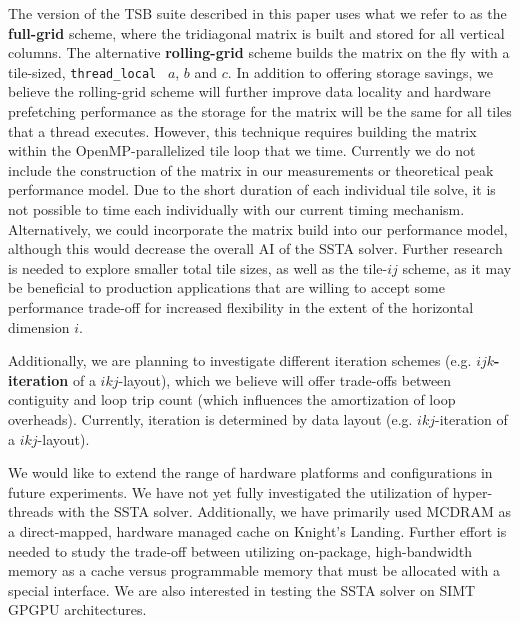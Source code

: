 \documentclass{sig-alternate-05-2015}
\begin{document}
The version of the TSB suite described in this paper uses what we refer to as
  the \textbf{full-grid} scheme, where the tridiagonal matrix is built and stored
  for all vertical columns.
The alternative \textbf{rolling-grid} scheme builds the matrix on the fly with
  a tile-sized, \lstinline{thread_local}~\cite{cppreference_thread_local}
  \(a\), \(b\) and \(c\).
In addition to offering storage savings, we believe the rolling-grid scheme
  will further improve data locality and hardware prefetching performance as the
  storage for the matrix will be the same for all tiles that a thread
  executes.
However, this technique requires building the matrix within the
  OpenMP-parallelized tile loop that we time.
Currently we do not include the construction of the matrix in our measurements
  or theoretical peak performance model.
Due to the short duration of each individual tile solve, it is not possible to
  time each individually with our current timing mechanism.
Alternatively, we could incorporate the matrix build into our performance
  model, although this would decrease the overall AI of the SSTA solver.
Further research is needed to explore smaller total tile sizes, as well as the
  tile-\(ij\) scheme, as it may be beneficial to production applications
  that are willing to accept some performance trade-off for increased flexibility
  in the extent of the horizontal dimension \(i\).

Additionally, we are planning to investigate different iteration schemes (e.g.
  \textbf{\(ijk\)-iteration} of a \(ikj\)-layout), which we believe will offer
  trade-offs between contiguity and loop trip count (which influences the
  amortization of loop overheads).
Currently, iteration is determined by data layout (e.g. \(ikj\)-iteration of a
  \(ikj\)-layout).

We would like to extend the range of hardware platforms and configurations in
  future experiments.
We have not yet fully investigated the utilization of hyper-threads with the
  SSTA solver.
Additionally, we have primarily used MCDRAM as a direct-mapped, hardware
managed cache on Knight's Landing.
Further effort is needed to study the trade-off between utilizing on-package,
  high-bandwidth memory as a cache versus programmable memory that must be
  allocated with a special interface.
We are also interested in testing the SSTA solver on SIMT GPGPU
  architectures.
\end{document}
